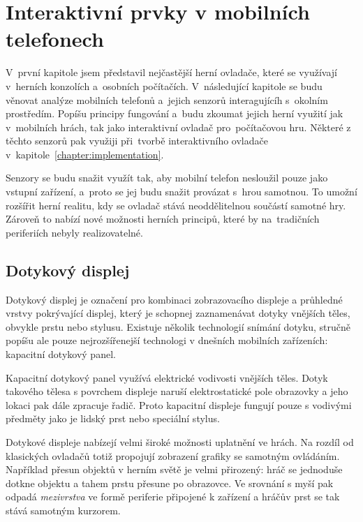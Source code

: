 \documentclass[thesis=B,czech,hidelinks]{FITthesis}[2012/06/26] %
\begin{document}
\chapter{Interaktivní prvky v mobilních telefonech}

V~první kapitole jsem představil nejčastější herní ovladače, které se využívají v~herních konzolích a~osobních počítačích. V~následující kapitole se budu věnovat analýze mobilních telefonů a~jejich senzorů interagujícíh s~okolním prostředím. Popíšu principy fungování a~budu zkoumat jejich herní využití jak v~mobilních hrách, tak jako interaktivní ovladač pro~počítačovou hru. Některé z těchto senzorů pak využiji při~tvorbě interaktivního ovladače v~kapitole~\ref{chapter:implementation}.

Senzory se budu snažit využít tak, aby mobilní telefon nesloužil pouze jako vstupní zařízení, a~proto se jej budu snažit provázat s~hrou samotnou. To umožní rozšířit herní realitu, kdy se ovladač stává neoddělitelnou součástí samotné hry. Zároveň to nabízí nové možnosti herních principů, které by na~tradičních periferiích nebyly realizovatelné.

\section{Dotykový displej}
\label{section:touchscreen}

Dotykový displej je označení pro kombinaci zobrazovacího displeje a průhledné vrstvy pokrývající displej, který je schopnej zaznamenávat dotyky vnějších těles, obvykle prstu nebo stylusu. \cite{gray2013does} Existuje několik technologií snímání dotyku, stručně popíšu ale pouze nejrozšířenejší technologi v dnešních mobilních zařízeních: kapacitní dotykový panel.

Kapacitní dotykový panel využívá elektrické vodivosti vnějších těles. Dotyk takového tělesa s povrchem displeje naruší elektrostatické pole obrazovky a jeho lokaci pak dále zpracuje řadič. Proto kapacitní displeje fungují pouze s vodivými předměty jako je lidský prst nebo speciální stylus.

Dotykové displeje nabízejí velmi široké možnosti uplatnění ve hrách. Na rozdíl od klasických ovladačů totiž propojují zobrazení grafiky se samotným ovládáním. Například přesun objektů v herním světě je velmi přirozený: hráč se jednoduše dotkne objektu a tahem prstu přesune po obrazovce. Ve srovnání s myší pak odpadá \textit{mezivrstva} ve formě periferie připojené k zařízení a hráčův prst se tak stává samotným kurzorem.
\end{document}
